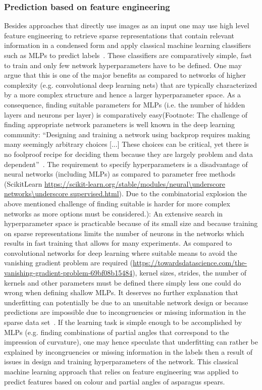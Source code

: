 \subsubsection{Prediction based on feature engineering}

Besides approaches that directly use images as an input one may use high level feature engineering to retrieve sparse representations that contain relevant information in a condensed form and apply classical machine learning classifiers such as MLPs to predict labels~\citep{zheng2018feature}. These classifiers are comparatively simple, fast to train and only few network hyperparameters have to be defined. One may argue that this is one of the major benefits as compared to networks of higher complexity (e.g. convolutional deep learning nets) that are typically characterized by a more complex structure and hence a larger hyperparameter space. As a consequence, finding suitable parameters for MLPs (i.e. the number of hidden layers and neurons per layer) is comparatively easy(Footnote: The challenge of finding appropriate network parameters is well known in the deep learning community: “Designing and training a network using backprop requires making many seemingly arbitrary choices [...] These choices can be critical, yet there is no foolproof recipe for deciding them because they are largely problem and data dependent”~\citep{lecun2012efficient}. The requirement to specify hyperparameters is a disadvantage of neural networks (including MLPs) as compared to parameter free methods (ScikitLearn \url{https://scikit-learn.org/stable/modules/neural\underscore networks\underscore supervised.html}). Due to the combinatorial explosion the above mentioned challenge of finding suitable is harder for more complex networks as more options must be considered.): An extensive search in hyperparameter space is practicable because of its small size and because training on sparse representations limits the number of neurons in the networks which results in fast training that allows for many experiments. As compared to convolutional networks for deep learning where suitable means to avoid the vanishing gradient problem are required (\url{https://towardsdatascience.com/the-vanishing-gradient-problem-69bf08b15484}), kernel sizes, strides, the number of kernels and other parameters must be defined there simply less one could do wrong when defining shallow MLPs. It deserves no further explanation that underfitting can potentially be due to an unsuitable network design or because predictions are impossible due to incongruencies or missing information in the sparse data set~\citep{lecun2012efficient}. If the learning task is simple enough to be accomplished by MLPs (e.g. finding combinations of partial angles that correspond to the impression of curvature), one may hence speculate that underfitting can rather be explained by incongruencies or missing information in the labels then a result of issues in design and training hyperparameters of the network. This classical machine learning approach that relies on feature engineering was applied to predict features based on colour and partial angles of asparagus spears.
